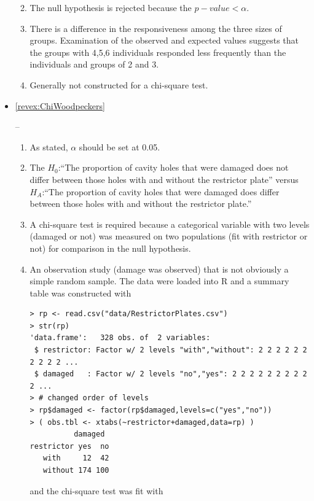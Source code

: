 \documentclass[10pt,openany]{book}\usepackage[]{graphicx}\usepackage[]{color}
\makeatletter
\newenvironment{kframe}{%
 \def\at@end@of@kframe{}%
 \ifinner\ifhmode%
  \def\at@end@of@kframe{\end{minipage}}%
  \begin{minipage}{\columnwidth}%
 \fi\fi%
 \def\FrameCommand##1{\hskip\@totalleftmargin \hskip-\fboxsep
 \colorbox{shadecolor}{##1}\hskip-\fboxsep
     \hskip-\linewidth \hskip-\@totalleftmargin \hskip\columnwidth}%
 \MakeFramed {\advance\hsize-\width
   \@totalleftmargin\z@ \linewidth\hsize
   \@setminipage}}%
 {\par\unskip\endMakeFramed%
 \at@end@of@kframe}
\newenvironment{knitrout}{}{} %
\makeatother
\begin{document}
\begin{itemize}
\begin{enumerate}
\begin{knitrout}
\end{knitrout}
      \item The null hypothesis is rejected because the $p-value<\alpha$.
      \item There is a difference in the responsiveness among the three sizes of groups.  Examination of the observed and expected values suggests that the groups with 4,5,6 individuals responded less frequently than the individuals and groups of 2 and 3.
      \item Generally not constructed for a chi-square test.
    \end{enumerate}

  \item \hypertarget{ans:ChiWoodpeckers}{\ref{revex:ChiWoodpeckers}} --
    \begin{enumerate}
      \item As stated, $\alpha$ should be set at 0.05.
      \item The $H_{0}$:``The proportion of cavity holes that were damaged does not differ between those holes with and without the restrictor plate'' versus $H_{A}$:``The proportion of cavity holes that were damaged does differ between those holes with and without the restrictor plate.''
      \item A chi-square test is required because a categorical variable with two levels (damaged or not) was measured on two populations (fit with restrictor or not) for comparison in the null hypothesis.
      \item An observation study (damage was observed) that is not obviously a simple random sample.  The data were loaded into R and a summary table was constructed with
\begin{knitrout}
\color{fgcolor}\begin{kframe}
\begin{verbatim}
> rp <- read.csv("data/RestrictorPlates.csv")
> str(rp)
'data.frame':	328 obs. of  2 variables:
 $ restrictor: Factor w/ 2 levels "with","without": 2 2 2 2 2 2 2 2 2 2 ...
 $ damaged   : Factor w/ 2 levels "no","yes": 2 2 2 2 2 2 2 2 2 2 ...
> # changed order of levels
> rp$damaged <- factor(rp$damaged,levels=c("yes","no"))
> ( obs.tbl <- xtabs(~restrictor+damaged,data=rp) )
          damaged
restrictor yes  no
   with     12  42
   without 174 100
\end{verbatim}
\end{kframe}
\end{knitrout}
and the chi-square test was fit with

\end{enumerate}
\end{itemize}
\end{document}

